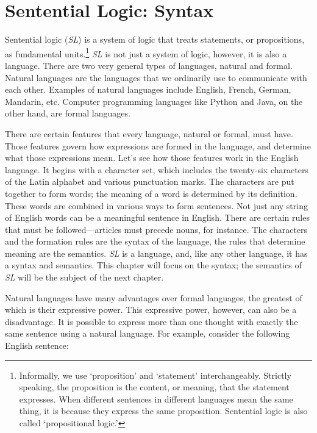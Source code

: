 \documentclass[../logic-text.tex]{subfiles}
\begin{document}
\chapter{Sentential Logic: Syntax}
\label{cha:sent-logic:-synt}

Sentential logic ({\em SL}) is a system of logic that treats statements, or propositions, as fundamental units.\footnote{Informally, we use `proposition' and `statement' interchangeably.
  Strictly speaking, the proposition is the content, or meaning, that the statement expresses.
  When different sentences in different languages mean the same thing, it is because they express the same proposition.
  Sentential logic is also called \enquote*{propositional logic.}}
\emph{SL} is not just a system of logic, however, it is also a language. There are two very general types of languages, natural and formal.
Natural languages are the languages that we ordinarily use to communicate with each other.
Examples of natural languages include English, French, German, Mandarin, etc.
Computer programming languages like Python and Java, on the other hand, are formal languages.

There are certain features that every language, natural or formal, must have.
Those features govern how expressions are formed in the language, and determine what those expressions mean.
Let's see how those features work in the English language.
It begins with a character set, which includes the twenty-six characters of the Latin alphabet and various punctuation marks. The characters are put together to form words; the meaning of a word is determined by its definition. These words are combined in various ways to form sentences. Not just any string of English words can be a meaningful sentence in English. There are certain rules that must be followed---articles must precede nouns, for instance. The characters and the formation rules are the syntax of the language, the rules that determine meaning are the semantics.
\emph{SL} is a language, and, like any other language, it has a syntax and semantics. This chapter will focus on the syntax; the semantics of \emph{SL} will be the subject of the next chapter.

Natural languages have many advantages over formal languages, the greatest of which is their expressive power.
This expressive power, however, can also be a disadvantage. 
It is possible to express more than one thought with exactly the same sentence using a natural language. For example, consider the following English sentence:
\end{document}
